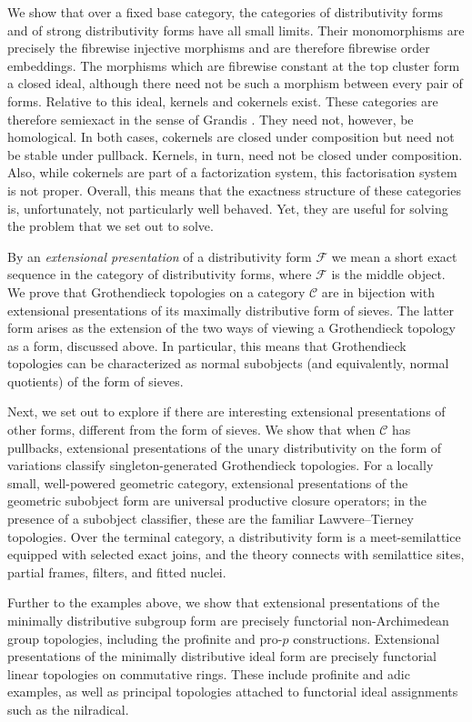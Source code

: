 \documentclass[12pt,oneside,reqno]{amsart}
\theoremstyle{definition}
\theoremstyle{remark}
\newcommand{\C}{\mathcal C}
\begin{document}
We show that over a fixed base category, the categories of distributivity forms and
of strong distributivity forms have all small limits.  Their
monomorphisms are precisely the fibrewise injective morphisms and are
therefore fibrewise order embeddings.  The morphisms which are
fibrewise constant at the top cluster form a closed ideal, although
there need not be such a morphism between every pair of forms.  Relative
to this ideal, kernels and cokernels exist. These categories are therefore semiexact in the sense of Grandis
\cite{GrandisRelative,GrandisBook}. They need not, however, be
homological. In both cases, cokernels are closed under composition but need not be
stable under pullback. Kernels,
in turn, need not be closed under composition. Also, while cokernels are part of a factorization system, this factorisation system is not proper. Overall, this means that the exactness structure of these categories is, unfortunately, not particularly well behaved. Yet, they are useful for solving the problem that we set out to solve.

By an \emph{extensional
presentation} of a distributivity form $\mathcal{F}$ we mean a short exact sequence in the category of distributivity forms, where $\mathcal{F}$ is the middle object. We prove that Grothendieck topologies on a category \(\C\) are in bijection with
extensional presentations of its maximally distributive form of sieves. The latter form arises as the extension of the two ways of viewing a Grothendieck topology as a form, discussed above. In particular, this means that Grothendieck topologies can be characterized as normal subobjects (and equivalently, normal quotients) of the form of sieves.

Next, we set out to explore if there are interesting extensional presentations of other forms, different from the form of sieves. We show that when \(\C\) has pullbacks, extensional presentations of the unary
distributivity on the form of variations classify singleton-generated
Grothendieck topologies.  For a locally small, well-powered geometric
category, extensional presentations of the geometric subobject form are
universal productive closure operators; in the presence of a subobject
classifier, these are the familiar Lawvere--Tierney topologies. Over
the terminal category, a distributivity form is a meet-semilattice
equipped with selected exact joins, and the theory connects with
semilattice sites, partial frames, filters, and fitted nuclei.

Further to the examples above, we show that extensional presentations
of the minimally distributive subgroup form are precisely functorial
non-Archimedean group topologies, including the profinite and pro-\(p\)
constructions.  Extensional presentations of the minimally distributive
ideal form are precisely functorial linear topologies on commutative
rings. These include profinite and adic examples, as well as principal
topologies attached to functorial ideal assignments such as the
nilradical.
\end{document}
